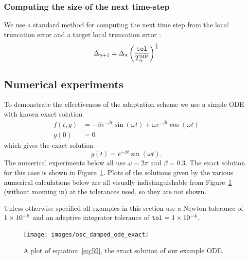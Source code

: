 

\subsubsection{Computing the size of the next time-step}

We use a standard method for computing the next time step from the local truncation error and a target local truncation error \toltt:\cite[pg.268]{Gresho-Sani}
\begin{equation}
\Delta_{n+1} = \Delta_{n} \left( \frac{{\textrm{\textup{\texttt{tol}}}}}{T_n^{\text{MP}}}  \right) ^{\frac{1}{3}}
\end{equation}


\subsection{Numerical experiments}

To demonstrate the effectiveness of the adaptation scheme we use a simple ODE with known exact solution
\begin{align}
  f(t,y) &= - \beta e^{-\beta t} \sin(\omega t) + \omega e^{-\beta t} \cos(\omega t) \\
  y(0) &= 0
\end{align}
which gives the exact solution
\begin{equation}
  \label{eq:59}
  y(t) = e^{-\beta t} \sin(\omega t).
\end{equation}
The numerical experiments below all use $\omega = 2 \pi$ and $\beta = 0.3$.
The exact solution for this case is shown in Figure~\ref{fig:mp-ode-exact}.
Plots of the solutions given by the various numerical calculations below are all visually indistinguishable from Figure~\ref{fig:mp-ode-exact} (without zooming in) at the tolerances used, so they are not shown.

Unless otherwise specified all examples in this section use a Newton tolerance of $1\times 10^{-8}$ and an adaptive integrator tolerance of ${\textrm{\textup{\texttt{tol}}}} = 1\times 10^{-4}$.

\begin{figure}[ht!]
  \centering
  \texttt{[image: images/osc\_damped\_ode\_exact]}
  \caption{A plot of equation~\eqref{eq:59}, the exact solution of our example ODE.}
  \label{fig:mp-ode-exact}
\end{figure}

